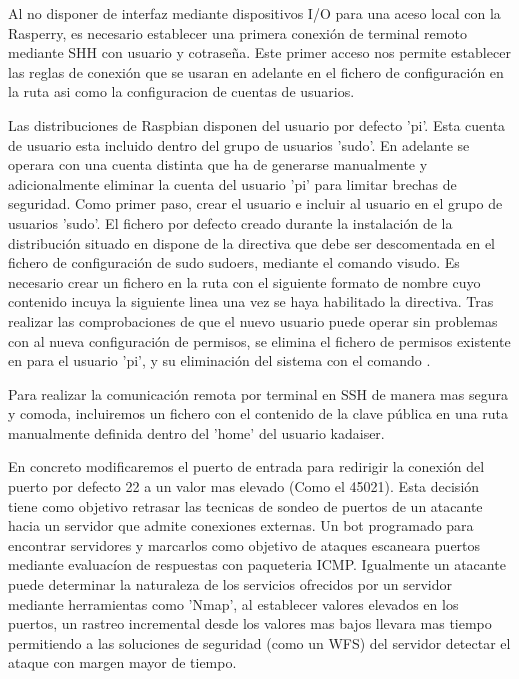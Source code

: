 Al no disponer de interfaz mediante dispositivos I/O para una aceso local con la Rasperry, es necesario establecer una primera conexión de terminal remoto mediante SHH con usuario y cotraseña. Este primer acceso nos permite establecer las reglas de conexión que se usaran en adelante en el fichero de configuración en la ruta  asi como la configuracion de cuentas de usuarios.

Las distribuciones de Raspbian disponen del usuario por defecto 'pi'. Esta cuenta de usuario esta incluido dentro del grupo de usuarios 'sudo'. En adelante se operara con una cuenta distinta que ha de generarse manualmente y adicionalmente eliminar la cuenta del usuario 'pi' para limitar brechas de seguridad. Como primer paso, crear el usuario  e incluir al usuario en el grupo de usuarios 'sudo'. El fichero por defecto creado durante la instalación de la distribución situado en  dispone de la directiva  que debe ser descomentada en el fichero de configuración de sudo sudoers, mediante el comando visudo. Es necesario crear un fichero en la ruta  con el siguiente formato de nombre  cuyo contenido incuya la siguiente linea  una vez se haya habilitado la directiva. Tras realizar las comprobaciones de que el nuevo usuario puede operar sin problemas con al nueva configuración de permisos, se elimina el fichero de permisos existente en  para el usuario 'pi', y su eliminación del sistema con el comando .

Para realizar la comunicación remota por terminal en SSH de manera mas segura y comoda, incluiremos un fichero con el contenido de la clave pública en una ruta manualmente definida dentro del 'home' del usuario kadaiser.

En concreto modificaremos el puerto de entrada para redirigir la conexión del puerto por defecto 22 a un valor mas elevado (Como el 45021). Esta decisión tiene como objetivo retrasar las tecnicas de sondeo de puertos de un atacante hacia un servidor que admite conexiones externas. Un bot programado para encontrar servidores y marcarlos como objetivo de ataques escaneara puertos mediante evaluacíon de respuestas con paqueteria ICMP. Igualmente un atacante puede determinar la naturaleza de los servicios ofrecidos por un servidor mediante herramientas como 'Nmap', al establecer valores elevados en los puertos, un rastreo incremental desde los valores mas bajos llevara mas tiempo permitiendo a las soluciones de seguridad (como un WFS) del servidor detectar el ataque con margen mayor de tiempo.

